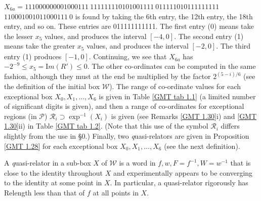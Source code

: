 \begin{remark}
\noindent 
$X_{6a} = 
111000000001000111\ 
111111110101001111\ 
011111010111111111$\hfill
{}
  \hfill $  
110001001011000111\ 0$
\vglue4pt\noindent 
is found by taking the 6th entry, the 12th entry, the 18th entry, and so on.  These entries are 011111111111.  The first entry (0) means take the
lesser $x_5$ values, and produces the interval $[-4,0].$  The second entry (1) means take the greater $x_5$ values, and produces the interval
$[-2,0].$  The third entry (1) produces $[-1,0].$  Continuing, we see that $X_{6a}^{\phantom{|}}$ has $-2^{-9} \le x_5 = {\mathrm Im}(R') \le 0.$  The other
co-ordinates can be computed in the same fashion, although they must at the end be multiplied by the factor $2^{(5 - i)/6}$ (see the definition of the
initial box
${\mathcal W}$).  The range of co-ordinate values for each  exceptional  box $X_0, X_1, \ldots, X_6$ is given in Table \ref{GMT tab 1.1} (a limited number of significant
digits is given), and  then a range of co-ordinates for exceptional regions (in ${\mathcal P}$) 
${\mathcal R}_i \supset \exp^{-1}(X_i)$ is given (see
Remarks \ref{GMT 1.30}i) and \ref{GMT 1.30}ii)
in Table \ref{GMT tab 1.2}. (Note that this use of the symbol ${\mathcal R}_i$ differs
slightly from the use in \S 0.)
Finally, two {\textit quasi-relators} are given in Proposition \ref{GMT 1.28} for each exceptional box $X_0, X_1, \ldots, X_6$ (see the next definition).\end{remark}
 
\begin{definition} \label{GMT 1.27} A {\textit quasi-relator} in a sub-box $X$ of ${\mathcal W}$ is a word in $f,w,F=f^{-1},W=w^{-1}$ that is close to the identity
throughout
$X$ and experimentally appears to be converging to the identity at some point in $X.$  In particular, a quasi-relator rigorously has Relength less than
that of $f$ at all points in $X.$
\end{definition}

